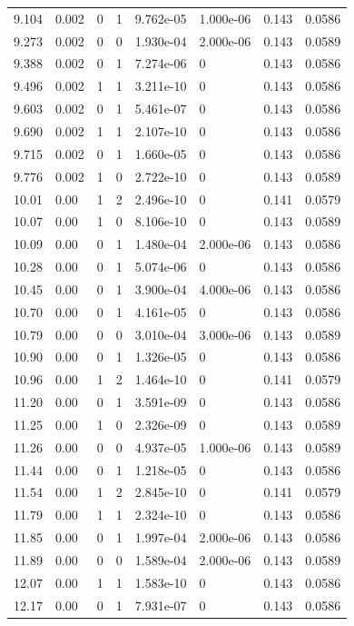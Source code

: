 \documentclass[preview]{standalone}
\begin{document}
{{{\begin{tabular}{L{1.2cm}C{1.2cm} C{0.3cm}C{0.5cm} C{1.4cm}C{1.4cm} C{1.4cm}C{1.4cm}}
  9.104  &  0.002  & 0     &  1 &  9.762e-05  & 1.000e-06  & 0.143 &  0.0586   \\ 
  9.273  &  0.002  & 0     &  0 &  1.930e-04  & 2.000e-06  & 0.143 &  0.0589   \\ 
  9.388  &  0.002  & 0     &  1 &  7.274e-06  & 0  & 0.143 &  0.0586   \\ 
  9.496  &  0.002  & 1     &  1 &  3.211e-10  & 0  & 0.143 &  0.0586   \\ 
  9.603  &  0.002  & 0     &  1 &  5.461e-07  & 0  & 0.143 &  0.0586   \\ 
  9.690  &  0.002  & 1     &  1 &  2.107e-10  & 0  & 0.143 &  0.0586   \\ 
  9.715  &  0.002  & 0     &  1 &  1.660e-05  & 0  & 0.143 &  0.0586   \\ 
  9.776  &  0.002  & 1     &  0 &  2.722e-10  & 0  & 0.143 &  0.0589   \\ 
  10.01  &  0.00  & 1     &  2 &  2.496e-10  & 0  & 0.141 &  0.0579   \\ 
  10.07  &  0.00  & 1     &  0 &  8.106e-10  & 0  & 0.143 &  0.0589   \\ 
  10.09  &  0.00  & 0     &  1 &  1.480e-04  & 2.000e-06  & 0.143 &  0.0586   \\ 
  10.28  &  0.00  & 0     &  1 &  5.074e-06  & 0  & 0.143 &  0.0586   \\ 
  10.45  &  0.00  & 0     &  1 &  3.900e-04  & 4.000e-06  & 0.143 &  0.0586   \\ 
  10.70  &  0.00  & 0     &  1 &  4.161e-05  & 0  & 0.143 &  0.0586   \\ 
  10.79  &  0.00  & 0     &  0 &  3.010e-04  & 3.000e-06  & 0.143 &  0.0589   \\ 
  10.90  &  0.00  & 0     &  1 &  1.326e-05  & 0  & 0.143 &  0.0586   \\ 
  10.96  &  0.00  & 1     &  2 &  1.464e-10  & 0  & 0.141 &  0.0579   \\ 
  11.20  &  0.00  & 0     &  1 &  3.591e-09  & 0  & 0.143 &  0.0586   \\ 
  11.25  &  0.00  & 1     &  0 &  2.326e-09  & 0  & 0.143 &  0.0589   \\ 
  11.26  &  0.00  & 0     &  0 &  4.937e-05  & 1.000e-06  & 0.143 &  0.0589   \\ 
  11.44  &  0.00  & 0     &  1 &  1.218e-05  & 0  & 0.143 &  0.0586   \\ 
  11.54  &  0.00  & 1     &  2 &  2.845e-10  & 0  & 0.141 &  0.0579   \\ 
  11.79  &  0.00  & 1     &  1 &  2.324e-10  & 0  & 0.143 &  0.0586   \\ 
  11.85  &  0.00  & 0     &  1 &  1.997e-04  & 2.000e-06  & 0.143 &  0.0586   \\ 
  11.89  &  0.00  & 0     &  0 &  1.589e-04  & 2.000e-06  & 0.143 &  0.0589   \\ 
  12.07  &  0.00  & 1     &  1 &  1.583e-10  & 0  & 0.143 &  0.0586   \\ 
  12.17  &  0.00  & 0     &  1 &  7.931e-07  & 0  & 0.143 &  0.0586   \\ 
\hline 
\end{tabular} 

}}}
\end{document}
